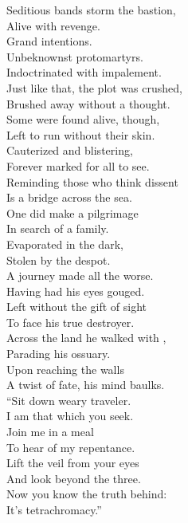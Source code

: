 Seditious bands storm the bastion, \\
Alive with revenge. \\
Grand intentions. \\
Unbeknownst protomartyrs. \\
Indoctrinated with impalement. \\

Just like that, the plot was crushed, \\
Brushed away without a thought. \\
Some were found alive, though, \\
Left to run without their skin. \\
Cauterized and blistering, \\
Forever marked for all to see. \\
Reminding those who think dissent \\
Is a bridge across the sea. \\

One did make a pilgrimage \\
In search of a family. \\
Evaporated in the dark, \\
Stolen by the despot. \\
A journey made all the worse. \\
Having had his eyes gouged. \\
Left without the gift of sight \\
To face his true destroyer. \\

Across the land he walked with , \\
Parading his ossuary. \\
Upon reaching the  walls \\
A twist of fate, his mind baulks. \\

``Sit down weary traveler. \\
I am that which you seek. \\
Join me in a meal \\
To hear of my repentance. \\
Lift the veil from your eyes \\
And look beyond the three. \\
Now you know the truth behind: \\
It's tetrachromacy.'' \\


